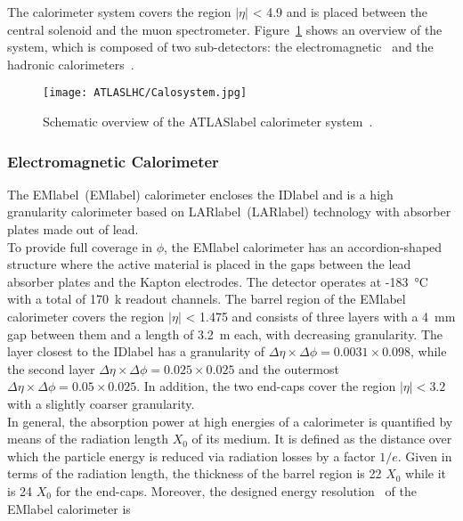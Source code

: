 The calorimeter system covers the region $|\eta|$ < 4.9 and is placed between the central solenoid and the muon spectrometer. Figure~\ref{figLHC:ATLASCalo} shows an overview of the system, which is composed of two sub-detectors: the electromagnetic~\cite{CERN-LHCC-96-041,CERN-LHCC-2017-018} and the hadronic calorimeters~\cite{CERN-LHCC-96-042}. 

\begin{figure}[htbp]
    \RawFloats
    \begin{center}
    \texttt{[image: ATLASLHC/Calosystem.jpg]}
    \caption{
        Schematic overview of the \acrshort{ATLASlabel} calorimeter system~\cite{Collaboration_2008}. 
    }
    \label{figLHC:ATLASCalo}
    \end{center}
\end{figure}

\subsubsection*{Electromagnetic Calorimeter}

The \acrlong{EMlabel}~(\acrshort{EMlabel}) calorimeter encloses the \acrshort{IDlabel} and is a high granularity calorimeter based on \acrlong{LARlabel}~(\acrshort{LARlabel}) technology with absorber plates made out of lead.\\

To provide full coverage in $\phi$, the \acrshort{EMlabel} calorimeter has an accordion-shaped structure where the active material is placed in the gaps between the lead absorber plates and the Kapton electrodes. The detector operates at -183~°C with a total of 170~k readout channels. The barrel region of the \acrshort{EMlabel} calorimeter covers the region $|\eta|$ < 1.475 and consists of three layers with a 4~mm gap between them and a length of 3.2~m each, with decreasing granularity. The layer closest to the \acrshort{IDlabel} has a granularity of $\Delta\eta\times\Delta\phi= 0.0031\times 0.098$, while the second layer $\Delta\eta\times\Delta\phi= 0.025\times 0.025$ and the outermost $\Delta\eta\times\Delta\phi= 0.05\times 0.025$. In addition, the two end-caps cover the region $|\eta| < 3.2$ with a slightly coarser granularity.\\

In general, the absorption power at high energies of a calorimeter is quantified by means of the radiation length $X_0$ of its medium. It is defined as the distance over which the particle energy is reduced via radiation losses by a factor $1/e$. Given in terms of the radiation length, the thickness of the barrel region is 22 $X_0$ while it is 24 $X_0$ for the end-caps. Moreover, the designed energy resolution~\cite{Collaboration_2008} of the \acrshort{EMlabel} calorimeter is

